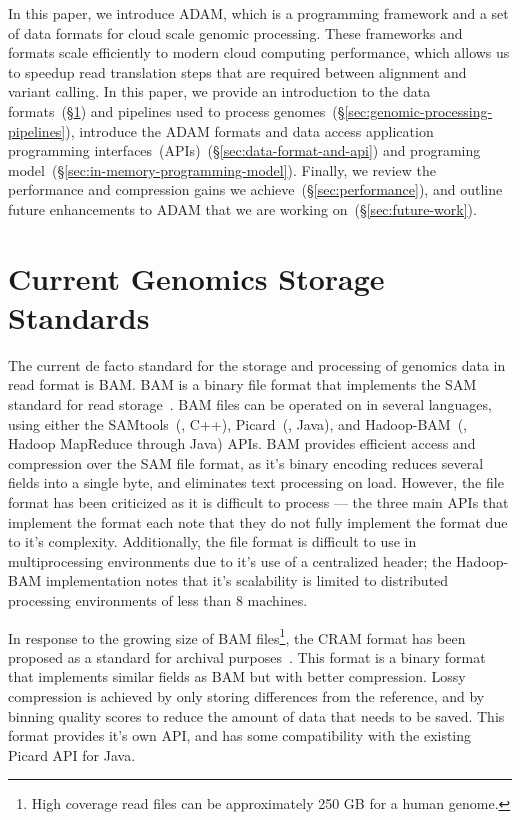 \documentclass[10pt,twocolumn]{article}
\begin{document}
In this paper, we introduce ADAM, which is a programming framework and a set of data formats for cloud scale genomic
processing. These frameworks and formats scale efficiently to modern cloud computing performance, which allows us to
speedup read translation steps that are required between alignment and variant calling. In this paper, we provide an
introduction to the data formats~(\S\ref{sec:current-genomics-storage-standards}) and pipelines used to process
genomes~(\S\ref{sec:genomic-processing-pipelines}), introduce the ADAM formats and data access
application programming interfaces~(APIs)~(\S\ref{sec:data-format-and-api}) and programing
model~(\S\ref{sec:in-memory-programming-model}). Finally, we review the performance and compression gains we
achieve~(\S\ref{sec:performance}), and outline future enhancements to ADAM that we are working on~(\S\ref{sec:future-work}).

\section{Current Genomics Storage Standards}
\label{sec:current-genomics-storage-standards}

The current de facto standard for the storage and processing of genomics data in read format is BAM. BAM is a binary file
format that implements the SAM standard for read storage~\cite{li09}. BAM files can be operated on in several languages,
using either the SAMtools~(\cite{li09}, C++), Picard~(\cite{picard}, Java), and Hadoop-BAM~(\cite{niemenmaa12}, Hadoop
MapReduce through Java) APIs. BAM provides efficient access and compression over the SAM file format, as it's binary
encoding reduces several fields into a single byte, and eliminates text processing on load. However, the file format has been
criticized as it is difficult to process --- the three main APIs that implement the format each note that they do not fully implement
the format due to it's complexity. Additionally, the file format is difficult to use in multiprocessing environments due to it's use
of a centralized header; the Hadoop-BAM implementation notes that it's scalability is limited to distributed processing
environments of less than 8 machines.

In response to the growing size of BAM files\footnote{High coverage read files can be approximately 250 GB for a human genome.},
the CRAM format has been proposed as a standard for archival purposes~\cite{fritz11}. This format is a binary format that implements
similar fields as BAM but with better compression. Lossy compression is achieved by only storing differences from the reference, and
by binning quality scores to reduce the amount of data that needs to be saved. This format provides it's own API, and has some
compatibility with the existing Picard API for Java.
\end{document}
